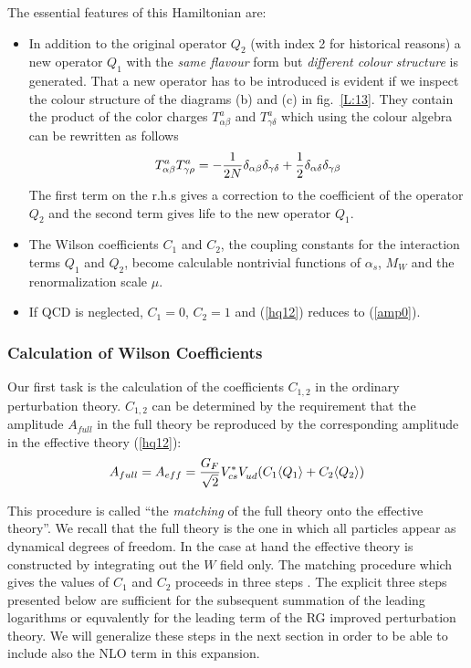 \documentclass[12pt,rotate]{article}
\def\as{\alpha_s}
\newcommand{\eqn}{\ref}
\begin{document}
\begin{itemize}
\begin{itemize}
\begin{itemize}
The essential features of this Hamiltonian are:
\begin{itemize}
\item In addition to the original operator $Q_2$ (with index 2 for 
historical reasons) 
 a new operator $Q_1$ with the {\it same flavour} form
but {\it different colour structure} is generated. 
That a new operator has to be introduced is evident if we
inspect the colour structure of the diagrams (b) and (c) in 
fig.~\ref{L:13}. They contain the
product of the color charges $T^a_{\alpha\beta}$ and 
$T^a_{\gamma\delta}$ which
using the colour algebra can be rewritten as follows
\begin{equation}\label{tata}
T^a_{\alpha\beta}T^a_{\gamma\rho}
=-{1\over 2N}\delta_{\alpha\beta}\delta_{\gamma\delta}+{1\over 2}
\delta_{\alpha\delta}\delta_{\gamma\beta}   \end{equation}
The first term on the r.h.s gives a correction to the coefficient
of the operator $Q_2$ and the second term gives life to the new
operator $Q_1$.
\item The Wilson coefficients $C_1$ and $C_2$, the coupling constants
for the interaction terms $Q_1$ and $Q_2$, become calculable nontrivial
functions of $\as$, $M_W$ and the renormalization scale $\mu$.
\item
If QCD is neglected, $C_1=0$, $C_2=1$ and
(\eqn{hq12}) reduces to (\eqn{amp0}).
\end{itemize}

\subsubsection{Calculation of Wilson Coefficients}
Our first task is the calculation of the coefficients $C_{1, 2}$
in the ordinary perturbation theory.
$C_{1, 2}$ can be  determined
by the requirement that the amplitude $A_{full}$ in the full theory be
reproduced by the corresponding amplitude in the effective theory
(\eqn{hq12}):
\begin{equation}\label{acq}
A_{full}=A_{eff}=
{G_F\over\sqrt{2}}V^*_{cs}V_{ud}^{}(C_1\langle Q_1\rangle +
C_2\langle Q_2\rangle)   \end{equation}

This procedure is called ``the {\it matching} of the 
full theory onto the
effective theory''. We recall that the full theory is the one in
which all particles appear as dynamical degrees of freedom.
In the case at hand the effective theory is constructed by
integrating out the $W$ field only. The matching procedure which
gives the values of $C_1$ and $C_2$ proceeds in three steps \cite{BBDM}.
The explicit three steps presented below are sufficient for
the subsequent summation of the leading logarithms or equvalently
for the leading term of the RG improved perturbation theory. 
We will generalize these steps in the next section in order to be able
to include also the NLO term in this expansion.


\end{itemize}
\end{itemize}
\end{itemize}
\end{document}
